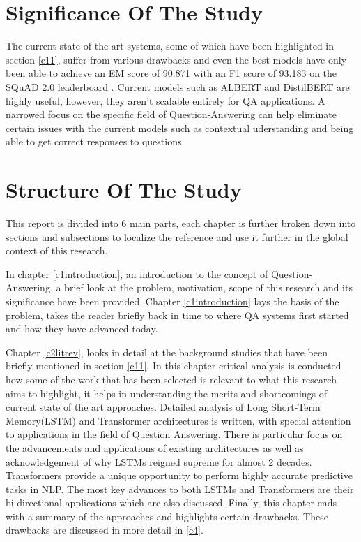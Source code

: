 \documentclass[a4paper,12pt]{report}
\begin{document}
        \section{Significance Of The Study}\label{14}

        The current state of the art systems, some of which have been highlighted in section \ref{c11}, suffer from various drawbacks and even the best models have only been able to achieve an EM score of 90.871 with an F1 score of 93.183 on the SQuAD 2.0 leaderboard \citep{squad}. Current models such as ALBERT and DistilBERT are highly useful, however, they aren't scalable entirely for QA applications. A narrowed focus on the specific field of Question-Answering can help eliminate certain issues with the current models such as contextual uderstanding and being able to get correct responses to questions.

        \section{Structure Of The Study}\label{15}

        This report is divided into 6 main parts, each chapter is further broken down into sections and subsections to localize the reference and use it further in the global context of this research.

        In chapter \ref{c1introduction}, an introduction to the concept of Question-Answering, a brief look at the problem, motivation, scope of this research and its significance have been provided. Chapter \ref{c1introduction} lays the basis of the problem, takes the reader briefly back in time to where QA systems first started and how they have advanced today.

        Chapter \ref{c2litrev}, looks in detail at the background studies that have been briefly mentioned in section \ref{c11}. In this chapter critical analysis is conducted how some of the work that has been selected is relevant to what this research aims to highlight, it helps in understanding the merits and shortcomings of current state of the art approaches. Detailed analysis of Long Short-Term Memory(LSTM) and Transformer architectures is written, with special attention to applications in the field of Question Answering. There is particular focus on the advancements and applications of existing architectures as well as acknowledgement of why LSTMs reigned supreme for almost 2 decades. Transformers provide a unique opportunity to perform highly accurate predictive tasks in NLP. The most key advances to both LSTMs and Transformers are their bi-directional applications which are also discussed. Finally, this chapter ends with a summary of the approaches and highlights certain drawbacks. These drawbacks are discussed in more detail in \ref{c4}.
\end{document}
